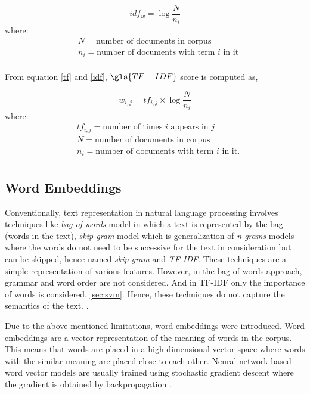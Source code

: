 \begin{equation}\label{idf}
idf_{w} = \log\frac{N}{n_{i}}
\end{equation}
where:
\begin{align*}
      & N=\text{number of documents in corpus}\\
      & n_{i}=\text{number of documents with term $i$ in it}\\
\end{align*}     

From equation \ref{tf} and \ref{idf}, $\gls{TF-IDF}$ score is computed as,

\begin{equation}\label{tf-idf}
w_{i,j} = tf_{i,j} \times \log\frac{N}{n_{i}}
\end{equation}
where:
\begin{align*}
      & tf_{i,j}=\text{number of times $i$ appears in $j$}\\
      & N=\text{number of documents in corpus}\\
      & n_{i}=\text{number of documents with term $i$ in it.}\\
\end{align*}

\subsection{Word Embeddings}
Conventionally, text representation in natural language processing involves techniques like \textit{bag-of-words} model in which a text is represented by the bag (words in the text), \textit{skip-gram} model which is generalization of \textit{n-grams} models where the words do not need to be successive for the text in consideration but can be skipped, hence named \textit{skip-gram} \cite{guthrie2006closer} and  \textit{\gls{TF-IDF}}. These techniques are a simple representation of various features. However, in the bag-of-words approach, grammar and word order are not considered. And in \gls{TF-IDF} only the importance of words is considered, \ref{sec:svm}. Hence, these techniques do not capture the semantics of the text. \cite{maas2011learning}.

Due to the above mentioned limitations, word embeddings were introduced. Word embeddings are a vector representation of the meaning of words in the corpus. This means that words are placed in a high-dimensional vector space where words with the similar meaning are placed close to each other. Neural network-based word vector models are usually trained using stochastic gradient descent where the gradient is obtained by backpropagation \cite{le2014distributed}.

